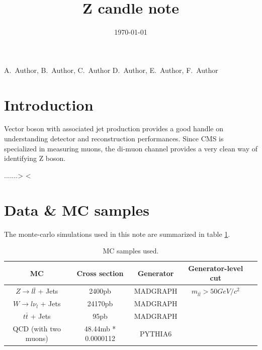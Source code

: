 \documentclass{cmspaper2}
\begin{document}
\begin{titlepage}

   \date{\today}

   \title{Z candle note}

   \begin{Authlist}
    A.~Author, B.~Author, C.~Author
    D.~Author, E.~Author, F.~Author
   \end{Authlist}


  \begin{abstract}
  \end{abstract}

\end{titlepage}

\setcounter{page}{2}

\section{Introduction}


Vector boson with associated jet production provides a good handle on understanding detector and reconstruction performances.
Since CMS is specialized in measuring muons, the di-muon channel provides a very clean way of identifying Z boson.

.......> <


\section{Data \& MC samples}

The monte-carlo simulations used in this note are summarized in table \ref{Table_MCSamples}.

\begin{table}[h]
   \caption{MC samples used.}
   \centering
   \begin{tabular}{|c|c|c|c|c|}
   \hline
   MC & Cross section & Generator & Generator-level cut \\\hline
   $Z \rightarrow l\bar{l}$ + Jets & 2400pb & MADGRAPH & $m_{l\bar{l}} > 50 GeV/c^2$ \\\hline
   $W \rightarrow l\nu_l$ + Jets & 24170pb & MADGRAPH &  \\\hline
   $t\bar{t}$ + Jets & 95pb & MADGRAPH &  \\\hline
   QCD (with two muons) & 48.44mb * 0.0000112 & PYTHIA6 &  \\\hline
   \end{tabular}
   \label{Table_MCSamples}
\end{table}
\end{document}

